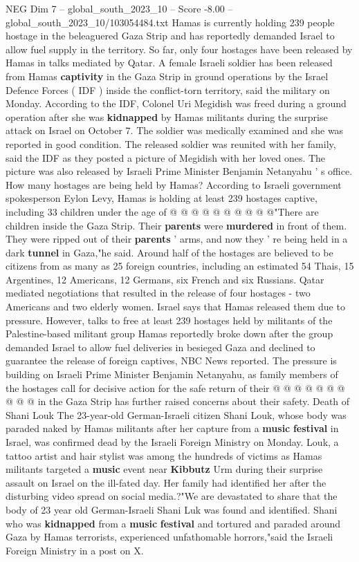 \begin{textsample}{NEG Dim 7 – global\_south\_2023\_10 – Score -8.00 – global\_south\_2023\_10/103054484.txt}  \label{ex:f7_neg_314}
Hamas is currently holding 239 people hostage in the beleaguered Gaza Strip and has reportedly demanded Israel to allow fuel supply in the territory.
So far, only four hostages have been released by Hamas in talks mediated by Qatar.
A female Israeli soldier has been released from Hamas \textbf{captivity} in the Gaza Strip in ground operations by the Israel Defence Forces ( IDF ) inside the conflict-torn territory, said the military on Monday.
According to the IDF, Colonel Uri Megidish was freed during a ground operation after she was \textbf{kidnapped} by Hamas militants during the surprise attack on Israel on October 7.
The soldier was medically examined and she was reported in good condition.
The released soldier was reunited with her family, said the IDF as they posted a picture of Megidish with her loved ones.
The picture was also released by Israeli Prime Minister Benjamin Netanyahu ' s office.
How many hostages are being held by Hamas?
According to Israeli government spokesperson Eylon Levy, Hamas is holding at least 239 hostages captive, including 33 children under the age of @ @ @ @ @ @ @ @ @ @"There are children inside the Gaza Strip.
Their \textbf{parents} were \textbf{murdered} in front of them.
They were ripped out of their \textbf{parents} ' arms, and now they ' re being held in a dark \textbf{tunnel} in Gaza,"he said.
Around half of the hostages are believed to be citizens from as many as 25 foreign countries, including an estimated 54 Thais, 15 Argentines, 12 Americans, 12 Germans, six French and six Russians.
Qatar mediated negotiations that resulted in the release of four hostages - two Americans and two elderly women.
Israel says that Hamas released them due to pressure.
However, talks to free at least 239 hostages held by militants of the Palestine-based militant group Hamas reportedly broke down after the group demanded Israel to allow fuel deliveries in besieged Gaza and declined to guarantee the release of foreign captives, NBC News reported.
The pressure is building on Israeli Prime Minister Benjamin Netanyahu, as family members of the hostages call for decisive action for the safe return of their @ @ @ @ @ @ @ @ @ @ in the Gaza Strip has further raised concerns about their safety.
Death of Shani Louk The 23-year-old German-Israeli citizen Shani Louk, whose body was paraded naked by Hamas militants after her capture from a \textbf{music} \textbf{festival} in Israel, was confirmed dead by the Israeli Foreign Ministry on Monday.
Louk, a tattoo artist and hair stylist was among the hundreds of victims as Hamas militants targeted a \textbf{music} event near \textbf{Kibbutz} Urm during their surprise assault on Israel on the ill-fated day.
Her family had identified her after the disturbing video spread on social media.?"We are devastated to share that the body of 23 year old German-Israeli Shani Luk was found and identified.
Shani who was \textbf{kidnapped} from a \textbf{music} \textbf{festival} and tortured and paraded around Gaza by Hamas terrorists, experienced unfathomable horrors,"said the Israeli Foreign Ministry in a post on X.

\end{textsample}
